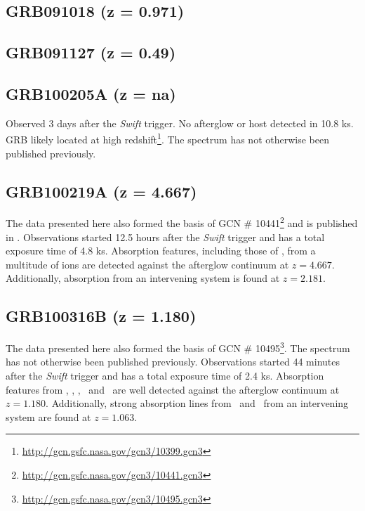 \documentclass{aa}    %
\begin{document}
\subsection{GRB091018 (z = 0.971)}


\subsection{GRB091127 (z = 0.49)}


\subsection{GRB100205A  (z = na)}
Observed 3 days after the \textit{Swift} trigger. No afterglow or host detected
in 10.8 ks. GRB likely located at high
redshift\footnote{\url{http://gcn.gsfc.nasa.gov/gcn3/10399.gcn3}}. The spectrum
has not otherwise been published previously.

\subsection{GRB100219A (z = 4.667)}
The data presented here also formed the basis of GCN \#
10441\footnote{\url{http://gcn.gsfc.nasa.gov/gcn3/10441.gcn3}} and is published
in \citet{Thone2013}. Observations started 12.5 hours after the \textit{Swift}
trigger and has a total exposure time of 4.8 ks. Absorption features, including
those of \lya, from a multitude of ions are detected against the afterglow
continuum at $z = 4.667$. Additionally, absorption from an intervening system
is found at $z = 2.181$.

\subsection{GRB100316B (z = 1.180)}
The data presented here also formed the basis of GCN \#
10495\footnote{\url{http://gcn.gsfc.nasa.gov/gcn3/10495.gcn3}}. The spectrum
has not otherwise been published previously. Observations started 44 minutes
after the \textit{Swift} trigger and has a total exposure time of 2.4 ks.
Absorption features from \feii, \alii, \aliii,	\mgii~and \mgi~are well detected
against the afterglow continuum at $z = 1.180$. Additionally, strong absorption
lines from \feii~and \mgii~from an intervening system are found at $z = 1.063$.
\end{document}
